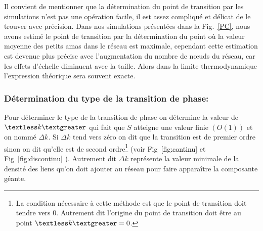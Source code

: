 Il convient de mentionner que la détermination du point de transition par les simulations n'est pas une opération facile, il est assez compliqué et délicat de le trouver avec précision. Dans nos simulations présentées dans la Fig.~\ref{PC}, nous avons estimé le point de transition par la détermination du point où la valeur moyenne des petits amas dans le réseau est maximale,  cependant cette estimation est devenue plus précise avec l'augmentation du nombre de nœuds du réseau, car les effets d'échelle diminuent avec la taille. Alors dans la limite thermodynamique l'expression théorique sera souvent exacte. 

\subsubsection{Détermination du type de la transition de phase:}
Pour déterminer le type de la transition de phase on détermine la valeur de $\km$ qui fait que $S$ atteigne une valeur finie $(O(1))$ et on nommé $\Delta k$. Si $\Delta k$ tend vers zéro on dit que la transition est de premier ordre sinon on dit qu'elle est de second ordre\footnote{La condition nécessaire à cette méthode est que le point de transition doit tendre vers $0$. Autrement dit l'origine du point de transition doit être au point $\km=0$.} (voir Fig~\ref{fig:continu} et Fig~\ref{fig:discontinu} ). Autrement dit
$\Delta k$ représente la valeur minimale de la densité des liens qu'on doit ajouter au réseau pour faire apparaître la composante géante.  
\\




